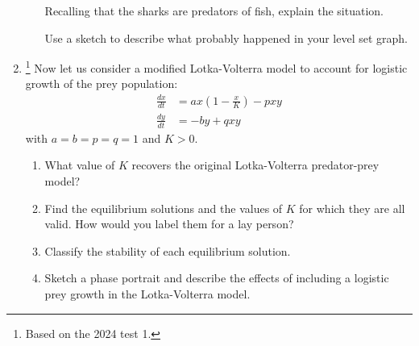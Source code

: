 \begin{enumerate}
\begin{enumerate}
		Recalling that the sharks are predators of fish, explain the situation.
		
		Use a sketch to describe what probably happened in your level set graph.	
	\end{enumerate}
	
	\newpage
	
	\item \label{q2} \footnote{Based on the 2024 test 1.} Now let us consider a modified Lotka-Volterra model to account for logistic growth of the prey population:
	\begin{align*}
		\frac{dx}{dt} & = ax \left( 1 - \frac{x}{K} \right) - pxy  \tag{logistic prey equation}\\
		\frac{dy}{dt} & = -by + qxy \tag{predator equation}
	\end{align*}
	with $a=b=p=q=1$ and $K>0$.

	\begin{enumerate}
		\item What value of $K$ recovers the original Lotka-Volterra predator-prey model?
		\item Find the equilibrium solutions and the values of $K$ for which they are all valid. How would you label them for a lay person?
		\item Classify the stability of each equilibrium solution.
		\item Sketch a phase portrait and describe the effects of including a logistic prey growth in the Lotka-Volterra model.
	
	\end{enumerate}
	
	
	
	
\end{enumerate}
















